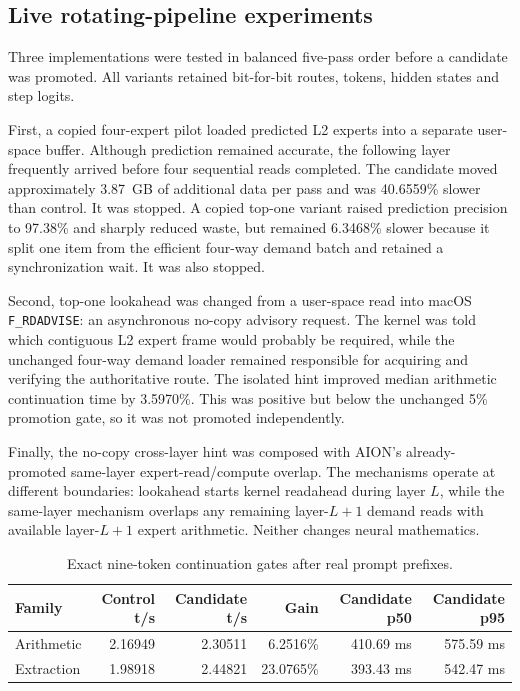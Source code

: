 \subsection{Live rotating-pipeline experiments}

Three implementations were tested in balanced five-pass order before a
candidate was promoted.  All variants retained bit-for-bit routes, tokens,
hidden states and step logits.

First, a copied four-expert pilot loaded predicted L2 experts into a separate
user-space buffer.  Although prediction remained accurate, the following
layer frequently arrived before four sequential reads completed.  The
candidate moved approximately 3.87~GB of additional data per pass and was
40.6559\% slower than control.  It was stopped.  A copied top-one variant
raised prediction precision to 97.38\% and sharply reduced waste, but remained
6.3468\% slower because it split one item from the efficient four-way demand
batch and retained a synchronization wait.  It was also stopped.

Second, top-one lookahead was changed from a user-space read into macOS
\texttt{F\_RDADVISE}: an asynchronous no-copy advisory request.  The kernel was
told which contiguous L2 expert frame would probably be required, while the
unchanged four-way demand loader remained responsible for acquiring and
verifying the authoritative route.  The isolated hint improved median
arithmetic continuation time by 3.5970\%.  This was positive but below the
unchanged 5\% promotion gate, so it was not promoted independently.

Finally, the no-copy cross-layer hint was composed with AION's already-promoted
same-layer expert-read/compute overlap.  The mechanisms operate at different
boundaries: lookahead starts kernel readahead during layer $L$, while the
same-layer mechanism overlaps any remaining layer-$L+1$ demand reads with
available layer-$L+1$ expert arithmetic.  Neither changes neural mathematics.

\begin{table}[ht]
\centering
\begin{tabular}{lrrrrr}
\toprule
Family & Control t/s & Candidate t/s & Gain & Candidate p50 & Candidate p95 \\
\midrule
Arithmetic & 2.16949 & 2.30511 & 6.2516\% & 410.69 ms & 575.59 ms \\
Extraction & 1.98918 & 2.44821 & 23.0765\% & 393.43 ms & 542.47 ms \\
\bottomrule
\end{tabular}
\caption{Exact nine-token continuation gates after real prompt prefixes.}
\end{table}

